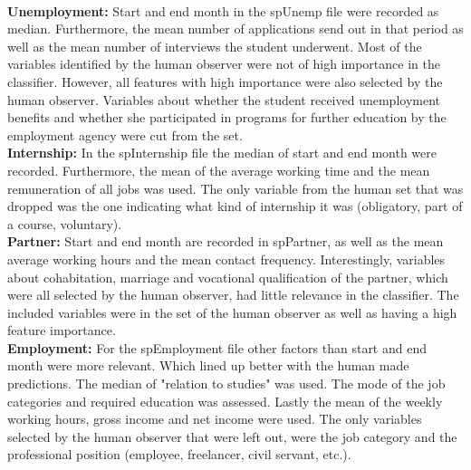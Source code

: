 \\
\textbf{Unemployment:} Start and end month in the spUnemp file were recorded as median. Furthermore, the mean number of applications send out in that period as well as the mean number of interviews the student underwent. Most of the variables identified by the human observer were not of high importance in the classifier. However, all features with high importance were also selected by the human observer. Variables about whether the student received unemployment benefits and whether she participated in programs for further education by the employment agency were cut from the set.
\\
\textbf{Internship:} In the spInternship file the median of start and end month were recorded. Furthermore, the mean of the average working time and the mean remuneration of all jobs was used. The only variable from the human set that was dropped was the one indicating what kind of internship it was (obligatory, part of a course, voluntary).
\\
\textbf{Partner:} Start and end month are recorded in spPartner, as well as the mean average working hours and the mean contact frequency. Interestingly, variables about cohabitation, marriage and vocational qualification of the partner, which were all selected by the human observer, had little relevance in the classifier. The included variables were in the set of the human observer as well as having a high feature importance.
\\
\textbf{Employment:} For the spEmployment file other factors than start and end month were more relevant. Which lined up better with the human made predictions. The median of "relation to studies" was used. The mode of the job categories and required education was assessed. Lastly the mean of the weekly working hours, gross income and net income were used. The only variables selected by the human observer that were left out, were the job category and the professional position (employee, freelancer, civil servant, etc.).

